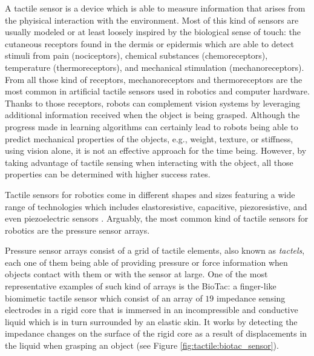 A tactile sensor is a device which is able to measure information that arises from the phyisical interaction with the environment. Most of this kind of sensors are usually modeled or at least loosely inspired by the biological sense of touch: the cutaneous receptors found in the dermis or epidermis which are able to detect stimuli from pain (nociceptors), chemical substances (chemoreceptors), temperature (thermoreceptors), and mechanical stimulation (mechanoreceptors). From all those kind of receptors, mechanoreceptors and thermoreceptors are the most common in artificial tactile sensors used in robotics and computer hardware. Thanks to those receptors, robots can complement vision systems by leveraging additional information received when the object is being grasped. Although the progress made in learning algorithms can certainly lead to robots being able to predict mechanical properties of the objects, e.g., weight, texture, or stiffness, using vision alone, it is not an effective approach for the time being. However, by taking advantage of tactile sensing when interacting with the object, all those properties can be determined with higher success rates.

Tactile sensors for robotics come in different shapes and sizes featuring a wide range of technologies which includes elastoresistive, capacitive, piezoresistive, and even piezoelectric sensors \cite{Dahiya2012}. Arguably, the most common kind of tactile sensors for robotics are the pressure sensor arrays.

Pressure sensor arrays consist of a grid of tactile elements, also known as \emph{tactels}, each one of them being able of providing pressure or force information when objects contact with them or with the sensor at large. One of the most representative examples of such kind of arrays is the BioTac: a finger-like biomimetic tactile sensor which consist of an array of $19$ impedance sensing electrodes in a rigid core that is immersed in an incompressible and conductive liquid which is in turn surrounded by an elastic skin. It works by detecting the impedance changes on the surface of the rigid core as a result of displacements in the liquid when grasping an object (see Figure \ref{fig:tactile:biotac_sensor}).

